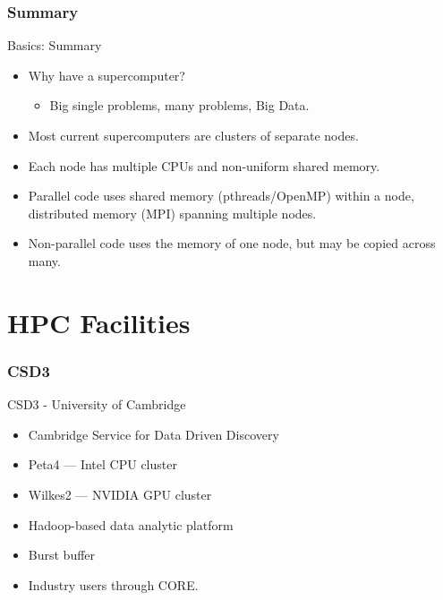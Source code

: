 \section{Summary}

\begin{frame}{Basics: Summary}

  \begin{itemize}
  \item<1->{\alert{Why have a supercomputer?}}
  \begin{itemize}\item<2->{Big single problems, many problems, Big Data.}\end{itemize}
  \item<3->{Most current supercomputers are \alert{clusters} of separate \alert{nodes}.}
  \item<4->{Each node has \alert{multiple CPUs} and \alert{non-uniform shared memory}.}
  \item<5->{\alert{Parallel} code uses shared memory (\alert{pthreads/OpenMP}) within a node, distributed memory (\alert{MPI}) spanning multiple nodes.}
  \item<6->{\alert{Non-parallel} code uses the memory of one node, but may be copied across many.}
  \end{itemize}
  
\end{frame}

\part{HPC Facilities}
\frame{\partpage}

\section{CSD3}
\begin{frame}{CSD3 - University of Cambridge}
\begin{itemize}
\item{Cambridge Service for Data Driven Discovery}
\pause
\medskip
\item{\alert{Peta4 --- Intel CPU cluster}}
\pause
\item{\alert{Wilkes2 --- NVIDIA GPU cluster}}
\pause
\medskip
\item{Hadoop-based data analytic platform}
\item{Burst buffer}
\item{Industry users through CORE.}
\end{itemize}
\end{frame}


